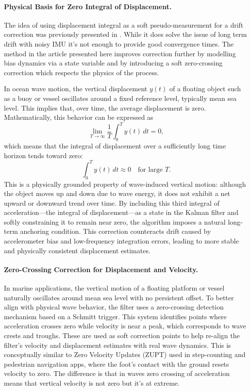 \documentclass[11pt,letterpaper]{article}
\begin{document}
\paragraph{Physical Basis for Zero Integral of Displacement.}
The idea of using displacement integral as a soft pseudo-measurement for a drift correction was previously presented in \cite{Sharkh2014}. While it does solve the issue of long term drift with noisy IMU it's not enough to provide good convergence times. The method in the article presented here improves correction further by modelling bias dynamics via a state variable and by introducing
a soft zero-crossing correction which respects the physics of the process.

In ocean wave motion, the vertical displacement \( y(t) \) of a floating object such as a buoy or vessel oscillates around a fixed reference level, typically mean sea level. This implies that, over time, the average displacement is zero. Mathematically, this behavior can be expressed as
\begin{equation}
\lim_{T \to \infty} \frac{1}{T} \int_0^T y(t) \, dt = 0,
\end{equation}
which means that the integral of displacement over a sufficiently long time horizon tends toward zero:
\begin{equation}
\int_0^T y(t) \, dt \approx 0 \quad \text{for large } T.
\end{equation}
This is a physically grounded property of wave-induced vertical motion: although the object moves up and down due to wave energy, it does not exhibit a net upward or downward trend over time. By including this third integral of acceleration---the integral of displacement---as a state in the Kalman filter and softly constraining it to remain near zero, the algorithm imposes a natural long-term anchoring condition. This correction counteracts drift caused by accelerometer bias and low-frequency integration errors, leading to more stable and physically consistent displacement estimates.

\paragraph{Zero-Crossing Correction for Displacement and Velocity.}
In marine applications, the vertical motion of a floating platform or vessel naturally oscillates around mean sea level with no persistent offset. To better align with physical wave behavior, the filter uses a zero-crossing detection mechanism based on a Schmitt trigger. This system identifies points where acceleration crosses zero while velocity is near a peak, which corresponds to wave crests and troughs. These are used as soft correction points to help re-align the filter’s velocity and displacement estimates with real wave dynamics. This is conceptually similar to Zero Velocity Updates (ZUPT) used in step-counting and pedestrian navigation apps, where the foot’s contact with the ground resets velocity to zero. The difference is that in waves zero crossing of acceleration means that vertical velocity is not zero but it's at extreme.
\end{document}
